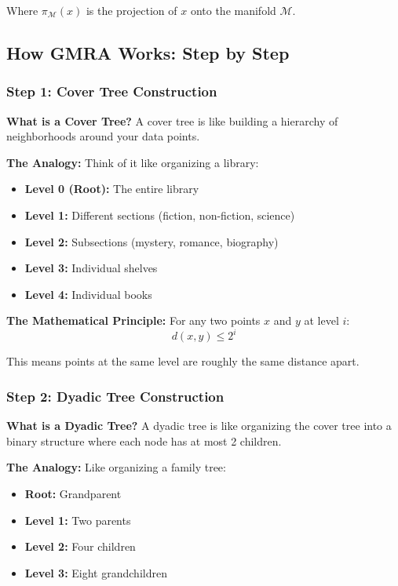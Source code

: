 \documentclass[12pt]{article}
\begin{document}
Where $\pi_{\mathcal{M}}(x)$ is the projection of $x$ onto the manifold $\mathcal{M}$.

\subsection{How GMRA Works: Step by Step}

\subsubsection{Step 1: Cover Tree Construction}

\textbf{What is a Cover Tree?}
A cover tree is like building a hierarchy of neighborhoods around your data points.

\textbf{The Analogy:} Think of it like organizing a library:
\begin{itemize}
    \item \textbf{Level 0 (Root):} The entire library
    \item \textbf{Level 1:} Different sections (fiction, non-fiction, science)
    \item \textbf{Level 2:} Subsections (mystery, romance, biography)
    \item \textbf{Level 3:} Individual shelves
    \item \textbf{Level 4:} Individual books
\end{itemize}

\textbf{The Mathematical Principle:} For any two points $x$ and $y$ at level $i$:
$$d(x,y) \leq 2^i$$

This means points at the same level are roughly the same distance apart.

\subsubsection{Step 2: Dyadic Tree Construction}

\textbf{What is a Dyadic Tree?}
A dyadic tree is like organizing the cover tree into a binary structure where each node has at most 2 children.

\textbf{The Analogy:} Like organizing a family tree:
\begin{itemize}
    \item \textbf{Root:} Grandparent
    \item \textbf{Level 1:} Two parents
    \item \textbf{Level 2:} Four children
    \item \textbf{Level 3:} Eight grandchildren
\end{itemize}
\end{document}
